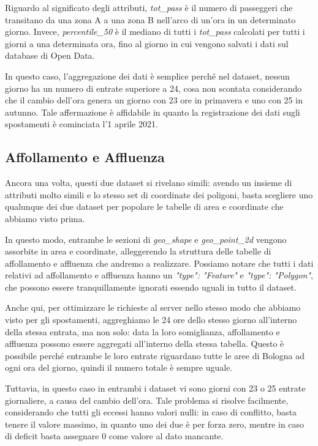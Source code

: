 Riguardo al significato degli attributi, \textit{tot\_pass} è il numero di passeggeri che transitano da una zona A a una zona B nell'arco di un'ora in un determinato giorno. Invece, \textit{percentile\_50} è il mediano di tutti i \textit{tot\_pass} calcolati per tutti i giorni a una determinata ora, fino al giorno in cui vengono salvati i dati sul database di Open Data.

In questo caso, l'aggregazione dei dati è semplice perché nel dataset, nessun giorno ha un numero di entrate superiore a 24, cosa non scontata considerando che il cambio dell'ora genera un giorno con 23 ore in primavera e uno con 25 in autunno. Tale affermazione è affidabile in quanto la registrazione dei dati sugli spostamenti è cominciata l'1 aprile 2021.

\subsection{Affollamento e Affluenza}
Ancora una volta, questi due dataset si rivelano simili: avendo un insieme di attributi molto simili e lo stesso set di coordinate dei poligoni, basta scegliere uno qualunque dei due dataset per popolare le tabelle di area e coordinate che abbiamo visto prima.

In questo modo, entrambe le sezioni di \textit{geo\_shape} e \textit{geo\_point\_2d} vengono assorbite in area e coordinate, alleggerendo la struttura delle tabelle di affollamento e affluenza che andremo a realizzare. Possiamo notare che tutti i dati relativi ad affollamento e affluenza hanno un \textit{"type": "Feature"} e \textit{"type": "Polygon"}, che possono essere tranquillamente ignorati essendo uguali in tutto il dataset.

Anche qui, per ottimizzare le richieste al server nello stesso modo che abbiamo visto per gli spostamenti, aggreghiamo le 24 ore dello stesso giorno all'interno della stessa entrata, ma non solo: data la loro somiglianza, affollamento e affluenza possono essere aggregati all'interno della stessa tabella. Questo è possibile perché entrambe le loro entrate riguardano tutte le aree di Bologna ad ogni ora del giorno, quindi il numero totale è sempre uguale.

Tuttavia, in questo caso in entrambi i dataset vi sono giorni con 23 o 25 entrate giornaliere, a causa del cambio dell'ora. Tale problema si risolve facilmente, considerando che tutti gli eccessi hanno valori nulli: in caso di conflitto, basta tenere il valore massimo, in quanto uno dei due è per forza zero, mentre in caso di deficit basta assegnare 0 come valore al dato mancante.

